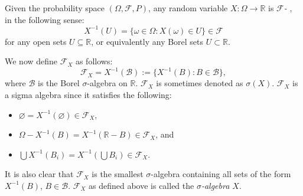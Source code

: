 \documentclass[12pt]{article}
\begin{document}
Given the probability space $(\Omega, \mathcal{F}, P)$, any random variable $X\colon \Omega \to \mathbb{R}$ is \emph{$ \mathcal{F}$-} ,\, in the following sense: $$X^{-1}(U) = \{ \omega \in \Omega \colon X(\omega) \in U\} \in \mathcal{F}$$ for any open sets $U \subseteq \mathbb{R}$, or equivalently any Borel sets $U\subset \mathbb{R}$.

We now define $\mathcal{F}_{X}$ as follows: $$\mathcal{F}_{X} = X^{-1}(\mathcal{B}) := \{X^{-1}(B)\colon B\in \mathcal{B}\},$$ where $\mathcal{B}$ is the Borel $\sigma$-algebra on $\mathbb{R}$. $\mathcal{F}_X$ is sometimes denoted as $\sigma(X)$. $\mathcal{F}_{X}$ is a sigma algebra since it satisfies the following: 

\begin{itemize}
\item $\varnothing = X^{-1}(\varnothing)\in \mathcal{F}_{X}$,
\item $\Omega-X^{-1}(B) = X^{-1}(\mathbb{R} - B)\in \mathcal{F}_{X}$, and
\item $\bigcup X^{-1}(B_i) = X^{-1}(\bigcup B_i)\in \mathcal{F}_{X}$.
\end{itemize}

It is also clear that $\mathcal{F}_X$ is the smallest $\sigma$-algebra containing all sets of the form $X^{-1}(B)$, $B\in\mathcal{B}$. $\mathcal{F}_{X}$ as defined above is called the \emph{$\sigma$-algebra  $X$}.

\end{document}
